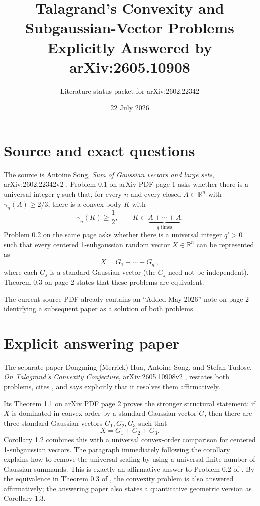 \documentclass[11pt]{article}
\title{Talagrand's Convexity and Subgaussian-Vector Problems\\
       Explicitly Answered by arXiv:2605.10908}
\author{Literature-status packet for arXiv:2602.22342}
\date{22 July 2026}
\newcommand{\R}{\mathbb{R}}
\newcommand{\gammam}{\gamma}
\begin{document}
\maketitle

\begin{center}
\end{center}

\section*{Source and exact questions}

The source is Antoine Song, \emph{Sum of Gaussian vectors and large sets},
arXiv:2602.22342v2 \cite{Song}.  Problem 0.1 on arXiv PDF page 1 asks whether
there is a universal integer $q$ such that, for every $n$ and every closed
$A\subset\R^n$ with $\gammam_n(A)\ge 2/3$, there is a convex body $K$ with
\[
  \gammam_n(K)\ge\frac12,
  \qquad K\subset \underbrace{A+\cdots+A}_{q\text{ times}}.
\]
Problem 0.2 on the same page asks whether there is a universal integer $q'>0$
such that every centered 1-subgaussian random vector $X\in\R^n$ can be
represented as
\[
  X=G_1+\cdots+G_{q'},
\]
where each $G_j$ is a standard Gaussian vector (the $G_j$ need not be
independent).  Theorem 0.3 on page 2 states that these problems are equivalent.

The current source PDF already contains an ``Added May 2026'' note on page 2
identifying a subsequent paper as a solution of both problems.

\section*{Explicit answering paper}

The separate paper Dongming (Merrick) Hua, Antoine Song, and Stefan Tudose,
\emph{On Talagrand's Convexity Conjecture}, arXiv:2605.10908v2
\cite{HST}, restates both problems, cites \cite{Song}, and says explicitly that
it resolves them affirmatively.

Its Theorem 1.1 on arXiv PDF page 2 proves the stronger structural statement:
if $X$ is dominated in convex order by a standard Gaussian vector $G$, then
there are three standard Gaussian vectors $G_1,G_2,G_3$ such that
\[
  X=G_1+G_2+G_3.
\]
Corollary 1.2 combines this with a universal convex-order comparison for
centered 1-subgaussian vectors.  The paragraph immediately following the
corollary explains how to remove the universal scaling by using a universal
finite number of Gaussian summands.  This is exactly an affirmative answer to
Problem 0.2 of \cite{Song}.  By the equivalence in Theorem 0.3 of \cite{Song},
the convexity problem is also answered affirmatively; the answering paper also
states a quantitative geometric version as Corollary 1.3.
\end{document}
